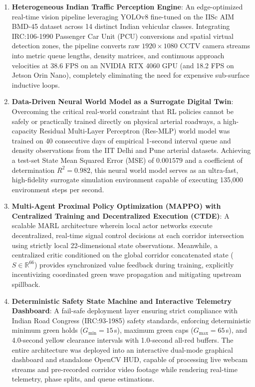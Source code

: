 \documentclass[12pt,a4paper,oneside]{report}
\begin{document}
\begin{enumerate}
    \item \textbf{Heterogeneous Indian Traffic Perception Engine}: An edge-optimized real-time vision pipeline leveraging YOLOv8 fine-tuned on the IISc AIM BMD-45 dataset across 14 distinct Indian vehicular classes. Integrating IRC:106-1990 Passenger Car Unit (PCU) conversions and spatial virtual detection zones, the pipeline converts raw $1920\times1080$ CCTV camera streams into metric queue lengths, density matrices, and continuous approach velocities at 38.6 FPS on an NVIDIA RTX 4060 GPU (and 18.2 FPS on Jetson Orin Nano), completely eliminating the need for expensive sub-surface inductive loops.
    
    \item \textbf{Data-Driven Neural World Model as a Surrogate Digital Twin}: Overcoming the critical real-world constraint that RL policies cannot be safely or practically trained directly on physical arterial roadways, a high-capacity Residual Multi-Layer Perceptron (Res-MLP) world model was trained on 40 consecutive days of empirical 1-second interval queue and density observations from the IIT Delhi and Pune arterial datasets. Achieving a test-set State Mean Squared Error (MSE) of $0.001579$ and a coefficient of determination $R^2 = 0.982$, this neural world model serves as an ultra-fast, high-fidelity surrogate simulation environment capable of executing 135,000 environment steps per second.
    
    \item \textbf{Multi-Agent Proximal Policy Optimization (MAPPO) with Centralized Training and Decentralized Execution (CTDE)}: A scalable MARL architecture wherein local actor networks execute decentralized, real-time signal control decisions at each corridor intersection using strictly local 22-dimensional state observations. Meanwhile, a centralized critic conditioned on the global corridor concatenated state ($S \in \mathbb{R}^{66}$) provides synchronized value feedback during training, explicitly incentivizing coordinated green wave propagation and mitigating upstream spillback.
    
    \item \textbf{Deterministic Safety State Machine and Interactive Telemetry Dashboard}: A fail-safe deployment layer ensuring strict compliance with Indian Road Congress (IRC:93-1985) safety standards, enforcing deterministic minimum green holds ($G_{\min} = 15$\,s), maximum green caps ($G_{\max} = 65$\,s), and 4.0-second yellow clearance intervals with 1.0-second all-red buffers. The entire architecture was deployed into an interactive dual-mode graphical dashboard and standalone OpenCV HUD, capable of processing live webcam streams and pre-recorded corridor video footage while rendering real-time telemetry, phase splits, and queue estimations.
\end{enumerate}
\end{document}
